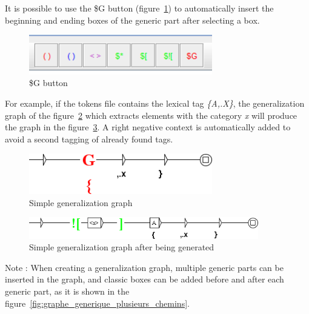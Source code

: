 \bigskip
It is possible to use the \$G button (figure~\ref{fig:bouton_g}) to automatically insert the beginning and ending boxes of the generic part after selecting a box.

\begin{figure}[!htb]
  \centering
  \includegraphics[width=8cm]{resources/img/bouton_g.png}
  \caption{\$G button}
  \label{fig:bouton_g}
\end{figure}

\bigskip
For example, if the tokens file contains the lexical tag \emph{\{A,.X\}}, the generalization graph of the figure~\ref{fig:graphe_generique_simple} which extracts elements with the category \textit{x} will produce the graph in the figure~\ref{fig:graphe_generique_simple_genere}. A right negative context is automatically added to avoid a second tagging of already found tags.

\begin{figure}[!htb]
  \centering
  \includegraphics[width=8cm]{resources/img/graphe_generique_simple.png}
  \caption{Simple generalization graph}
  \label{fig:graphe_generique_simple}
\end{figure}

\begin{figure}[!htb]
  \centering
  \includegraphics[width=10cm]{resources/img/graphe_generique_simple_genere.png}
  \caption{Simple generalization graph after being generated}
  \label{fig:graphe_generique_simple_genere}
\end{figure}

\bigskip
Note : When creating a generalization graph, multiple generic parts can be inserted in the graph, and classic boxes can be added before and after each generic part, as it is shown in the figure~\ref{fig:graphe_generique_plusieurs_chemins}.

